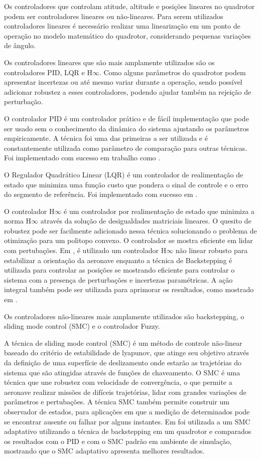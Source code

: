 Os controladores que controlam atitude, altitude e posições lineares no quadrotor podem ser controladores lineares ou não-lineares. Para serem utilizados controladores lineares é necessário realizar uma linearização em um ponto de operação no modelo matemático do quadrotor, considerando pequenas variações de ângulo.

Os controladores lineares que são mais amplamente utilizados são os controladores PID, LQR e H$\infty$. Como alguns parâmetros do quadrotor podem apresentar incertezas ou até mesmo variar durante a operação, sendo possível adicionar robustez a esses controladores, podendo ajudar também na rejeição de perturbação. 

O controlador PID é um controlador prático e de fácil implementação que pode ser usado sem o conhecimento da dinâmica do sistema ajustando os parâmetros empiricamente. A técnica foi uma das primeiras a ser utilizada e é constantemente utilizada como parâmetro de comparação para outras técnicas. Foi implementado com sucesso em trabalho como \cite{bouabdallah2004design,Hoffmann2007}.

O Regulador Quadrático Linear (LQR) é um controlador de realimentação de estado que minimiza uma função custo que pondera o sinal de controle e o erro do segmento de referência. Foi implementado com sucesso em \cite{bouabdallah2004design,waslander2005multi}.

O controlador H$\infty$ é um controlador por realimentação de estado que minimiza a norma H$\infty$ através da solução de desigualdades matriciais lineares. O quesito de robustez pode ser facilmente adicionado nessa técnica solucionando o problema de otimização para um politopo convexo. O controlador se mostra eficiente em lidar com pertubações. Em \cite{raffo2008backstepping}, é utilizado um controlador H$\infty$ não linear robusto para estabilizar a orientação da aeronave enquanto a técnica de Backstepping é utilizada para controlar as posições se mostrando eficiente para controlar o sistema com a presença de perturbações e incertezas paramétricas. A ação integral também pode ser utilizada para aprimorar os resultados, como mostrado em \cite{Raffo2010}.

Os controladores não-lineares mais amplamente utilizados são backstepping, o sliding mode control (SMC) e o controlador Fuzzy.

A técnica de sliding mode control (SMC) é um método de controle não-linear baseado do critério de estabilidade de lyapunov, que atinge seu objetivo através da definição de uma superfície de deslizamento onde estarão as trajetórias do sistema que são atingidas através de funções de chaveamento. O SMC é uma técnica que une robustez com velocidade de convergência, o que permite a aeronave realizar missões de difíceis trajetórias, lidar com grandes variações de parâmetros e pertubações. A técnica SMC também permite construir um observador de estados, para aplicações em que a medição de determinados pode se encontrar ausente ou falhar por alguns instantes. Em \cite{Zhao2018a} foi utilizada a um SMC adaptativo utilizando a técnica de backstepping em um quadrotor e comparados os resultados com o PID e com o SMC padrão em ambiente de simulação, mostrando que o SMC adaptativo apresenta melhores resultados.

